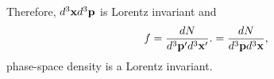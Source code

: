 Therefore, $d^3 {\bf x} d^3 {\bf p}$ is Lorentz invariant and
\begin{equation}
f = \frac{d N}{d^3 {\bf p}' d^3 {\bf x}'}. = \frac{d N}{d^3 {\bf p}
  d^3 {\bf x}},
\label{eq:319}
\end{equation}
phase-space density is a Lorentz invariant.

